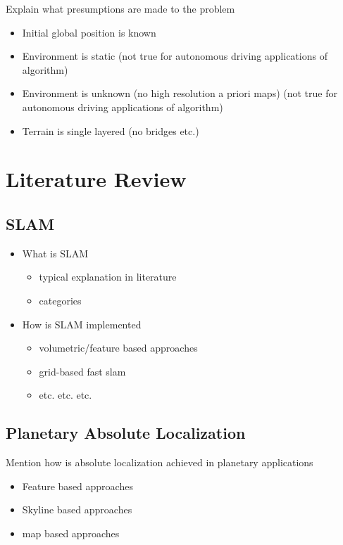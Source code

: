 Explain what presumptions are made to the problem

\begin{itemize}
    \item Initial global position is known
    \item Environment is static (not true for autonomous driving applications of algorithm)
    \item Environment is unknown (no high resolution a priori maps) (not true for autonomous driving applications of algorithm)
    \item Terrain is single layered (no bridges etc.)
\end{itemize}

\section{Literature Review}

\subsection{SLAM}

\begin{itemize}
    \item  What is SLAM
        \begin{itemize}
            \item typical explanation in literature
            \item categories
        \end{itemize}
    \item How is SLAM implemented
        \begin{itemize}
            \item volumetric/feature based approaches
            \item grid-based fast slam
            \item etc. etc. etc.
        \end{itemize}
\end{itemize}

\subsection{Planetary Absolute Localization}

Mention how is absolute localization achieved in planetary applications

\begin{itemize}
    \item Feature based approaches
    \item Skyline based approaches
    \item map based approaches
\end{itemize}

